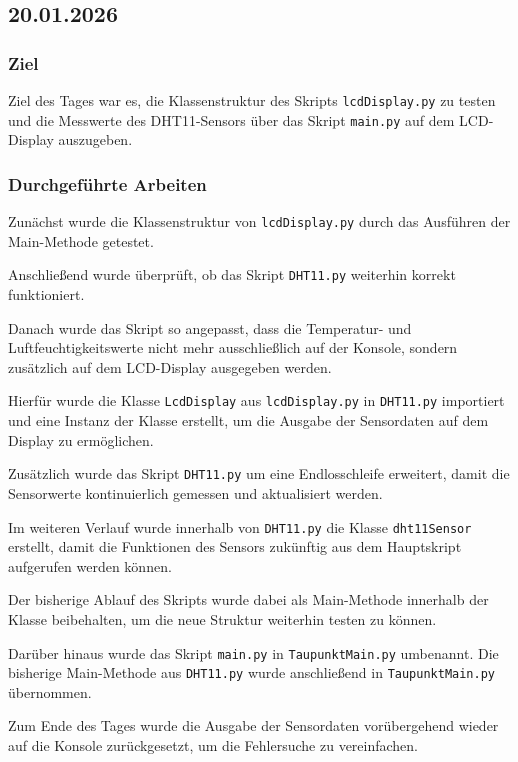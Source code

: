 \subsection{20.01.2026}

\subsubsection{Ziel}

Ziel des Tages war es, die Klassenstruktur des Skripts
\texttt{lcdDisplay.py} zu testen und die Messwerte des
DHT11-Sensors über das Skript \texttt{main.py} auf dem
LCD-Display auszugeben.

\subsubsection{Durchgeführte Arbeiten}

Zunächst wurde die Klassenstruktur von
\texttt{lcdDisplay.py} durch das Ausführen der Main-Methode
getestet.

Anschließend wurde überprüft, ob das Skript
\texttt{DHT11.py} weiterhin korrekt funktioniert.

Danach wurde das Skript so angepasst, dass die Temperatur-
und Luftfeuchtigkeitswerte nicht mehr ausschließlich auf der
Konsole, sondern zusätzlich auf dem LCD-Display ausgegeben
werden.

Hierfür wurde die Klasse \texttt{LcdDisplay} aus
\texttt{lcdDisplay.py} in \texttt{DHT11.py} importiert und
eine Instanz der Klasse erstellt, um die Ausgabe der
Sensordaten auf dem Display zu ermöglichen.

Zusätzlich wurde das Skript \texttt{DHT11.py} um eine
Endlosschleife erweitert, damit die Sensorwerte kontinuierlich
gemessen und aktualisiert werden.

Im weiteren Verlauf wurde innerhalb von
\texttt{DHT11.py} die Klasse \texttt{dht11Sensor}
erstellt, damit die Funktionen des Sensors zukünftig aus
dem Hauptskript aufgerufen werden können.

Der bisherige Ablauf des Skripts wurde dabei als
Main-Methode innerhalb der Klasse beibehalten, um die neue
Struktur weiterhin testen zu können.

Darüber hinaus wurde das Skript \texttt{main.py} in
\texttt{TaupunktMain.py} umbenannt.
Die bisherige Main-Methode aus \texttt{DHT11.py}
wurde anschließend in \texttt{TaupunktMain.py}
übernommen.

Zum Ende des Tages wurde die Ausgabe der Sensordaten
vorübergehend wieder auf die Konsole zurückgesetzt,
um die Fehlersuche zu vereinfachen.


